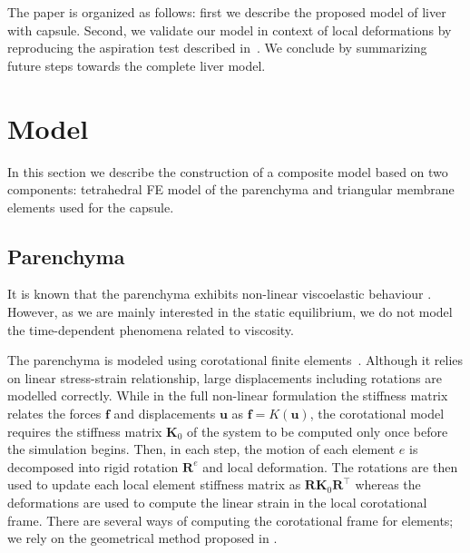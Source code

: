 \documentclass{acm_proc_article-sp}
\renewcommand{\Vec}[1]{\mathbf{#1}}
\newcommand{\Mat}[1]{\mathbf{#1}}
\begin{document}

The paper is organized as follows: first we describe the proposed model of
liver with capsule. Second, we validate our model in context of local
deformations by reproducing the aspiration test described
in~\cite{Hollenstein2006}. We conclude by summarizing future steps towards the
complete liver model.




\section{Model} %

In this section we describe the construction of a composite model
based on two components: tetrahedral FE model of the 
parenchyma and
triangular membrane elements used for the capsule.

\subsection{Parenchyma} %

It is known that the parenchyma exhibits non-linear viscoelastic behaviour \cite{Marchesseau2010}.
However, as we are mainly interested in the static equilibrium, we do not model the time-dependent
phenomena related to viscosity.


The parenchyma is modeled using corotational finite elements~\cite{Felippa2005}.
Although it relies on linear stress-strain relationship, large displacements including rotations are modelled correctly. 
While in the full non-linear formulation the stiffness matrix relates the forces $\Vec{f}$ and 
displacements $\Vec{u}$ as $\Vec{f} = K(\Vec{u})$, the corotational model 
requires the stiffness matrix $\Mat{K}_0$ of the system to be computed only once before the simulation begins. 
Then, in each step, the motion of each element $e$ is decomposed into rigid rotation $\Mat{R}^e$ and local deformation. 
The rotations are then used to update each local element stiffness matrix as $\Mat{R}\Mat{K}_0\Mat{R}^{\top}$
whereas the deformations are used to compute the linear strain in the local corotational frame.
There are several ways of computing the corotational frame for elements; we rely on
the geometrical method proposed in \cite{Nesme2005}.
\end{document}
